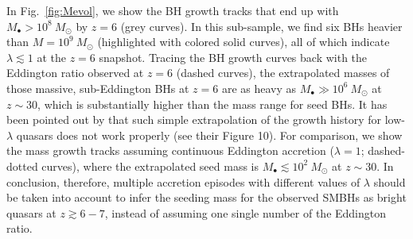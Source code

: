 \documentclass[twocolumn, twocolappendix]{aastex63}
\newcommand{\Msun}{M_\odot}
\newcommand{\Mbh}{M_\bullet}
\newcommand{\red}[1]{\textcolor{red}{ #1}}
\newcommand{\blue}[1]{\textcolor{blue}{ #1}}
\begin{document}
\begin{CJK*}{UTF8}{gbsn}
In Fig.~\ref{fig:Mevol}, we show the BH growth tracks that end up with $M_\bullet>10^8~\Msun$ by $z=6$ (grey curves).
In this sub-sample, we find six BHs heavier than $M=10^9~\Msun$ (highlighted with colored solid curves),
all of which indicate $\lambda \lesssim 1$ at the  $z=6$ snapshot.
Tracing the BH growth curves back with the Eddington ratio observed at $z=6$ (dashed curves),
the extrapolated masses of those massive, sub-Eddington BHs at $z=6$ are as heavy as $\Mbh \gg 10^6~\Msun$ at $z\sim 30$,
which is substantially higher than the mass range for seed BHs.
%
It has been pointed out by \cite{2019ApJ...880...77O} that such simple extrapolation of the growth history for low-$\lambda$ quasars 
does not work properly (see their Figure 10).
For comparison, we show the mass growth tracks assuming continuous Eddington accretion ($\lambda=1$; dashed-dotted curves),
where the extrapolated seed mass is $\Mbh \lesssim 10^2~\Msun$ at $z\sim 30$.
In conclusion, therefore, multiple accretion episodes with different values of $\lambda$ should be taken into account 
to infer the seeding mass for the observed SMBHs as bright quasars at $z\gtrsim 6-7$,
instead of assuming one single number of the Eddington ratio.





\end{CJK*}
\end{document}
